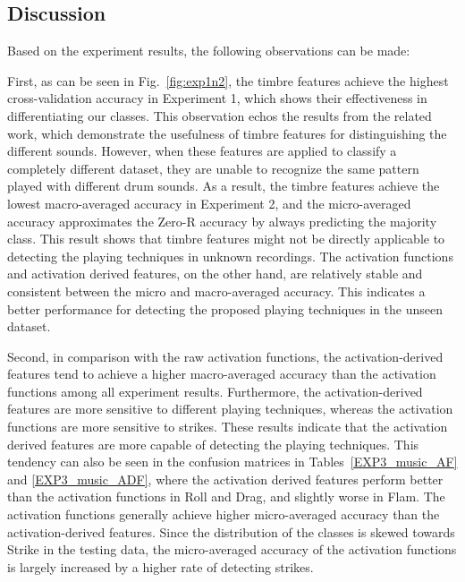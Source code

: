 \documentclass{article}
\begin{document}

\subsection{Discussion}
\label{ssec:discussion}
Based on the experiment results, the following observations can be made: 

First,  as can be seen in Fig.~\ref{fig:exp1n2}, the timbre features achieve the highest cross-validation accuracy in Experiment 1, which shows their effectiveness in differentiating our classes. This observation echos the results from the related work, which demonstrate the usefulness of timbre features for distinguishing the different sounds. However, when these features are applied to classify a completely different dataset, they are unable to recognize the same pattern played with different drum sounds. As a result, the timbre features achieve the lowest macro-averaged accuracy in Experiment 2, and the micro-averaged accuracy approximates the Zero-R accuracy by always predicting the majority class. 
This result shows that timbre features might not be directly applicable to detecting the playing techniques in unknown recordings. The activation functions and activation derived features, on the other hand, are relatively stable and consistent between the micro and macro-averaged accuracy. This indicates a better performance for detecting the proposed playing techniques in the unseen dataset. 

Second, in comparison with the raw activation functions, the activation-derived features tend to achieve a higher macro-averaged accuracy than the activation functions among all experiment results. Furthermore, the activation-derived features are more sensitive to different playing techniques, whereas the activation functions are more sensitive to strikes. 
These results indicate that the activation derived features are more capable of detecting the playing techniques. This tendency can also be seen in the confusion matrices in Tables~\ref{EXP3_music_AF} and \ref{EXP3_music_ADF}, where the activation derived features perform better than the activation functions in Roll and Drag, and slightly worse in Flam. The activation functions generally achieve higher micro-averaged accuracy than the activation-derived features. Since the distribution of the classes is skewed towards Strike in the testing data, the micro-averaged accuracy of the activation functions is largely increased by a higher rate of detecting strikes.
\end{document}
